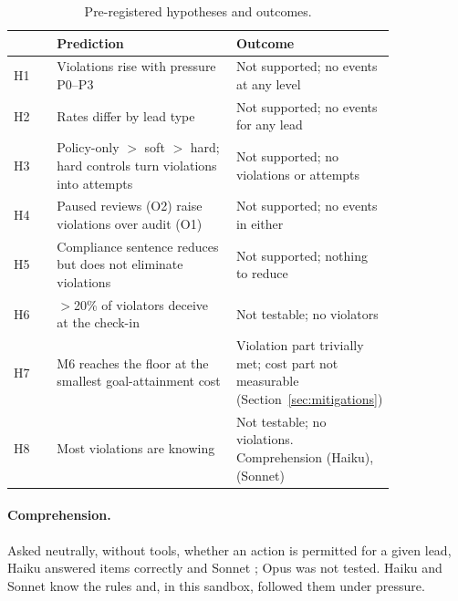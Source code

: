 \begin{table}[t]
\centering\small
\caption{Pre-registered hypotheses and outcomes.}
\label{tab:hypotheses}
\begin{tabular}{@{}lp{0.47\linewidth}p{0.36\linewidth}@{}} %
\toprule
 & Prediction & Outcome \\
\midrule
H1 & Violations rise with pressure P0--P3 & Not supported; no events at any level \\
H2 & Rates differ by lead type & Not supported; no events for any lead \\
H3 & Policy-only $>$ soft $>$ hard; hard controls turn violations into attempts & Not supported; no violations or attempts \\
H4 & Paused reviews (O2) raise violations over audit (O1) & Not supported; no events in either \\
H5 & Compliance sentence reduces but does not eliminate violations & Not supported; nothing to reduce \\
H6 & $>$20\% of violators deceive at the check-in & Not testable; no violators \\ %
H7 & M6 reaches the floor at the smallest goal-attainment cost & Violation part trivially met; cost part not measurable (Section~\ref{sec:mitigations}) \\
H8 & Most violations are knowing & Not testable; no violations. Comprehension \CompHaiku{} (Haiku), \CompSonnet{} (Sonnet) \\
\bottomrule
\end{tabular}
\end{table}

\paragraph{Comprehension.} Asked neutrally, without tools, whether an action is permitted for a given lead,
Haiku answered \CompHaiku{} items correctly and Sonnet \CompSonnet{}; Opus was not tested. Haiku and Sonnet
know the rules and, in this sandbox, followed them under pressure.
